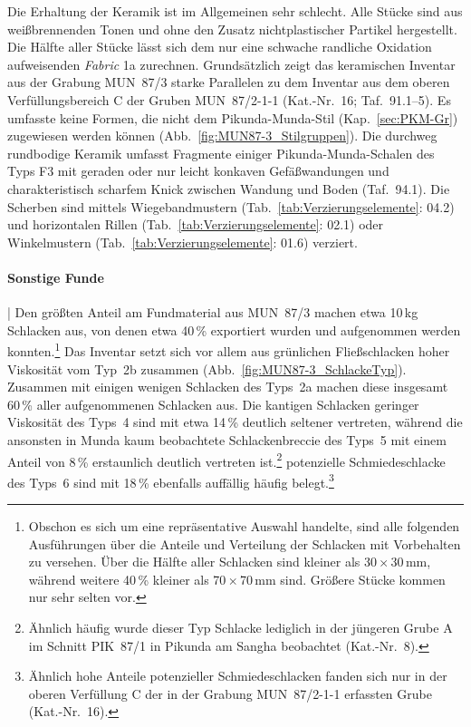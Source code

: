 Die Erhaltung der Keramik ist im Allgemeinen sehr schlecht. Alle Stücke sind aus weißbrennenden Tonen und ohne den Zusatz nichtplastischer Partikel hergestellt. Die Hälfte aller Stücke lässt sich dem nur eine schwache randliche Oxidation aufweisenden \textit{Fabric} 1a zurechnen. Grundsätzlich zeigt das keramischen Inventar aus der Grabung MUN~87/3 starke Parallelen zu dem Inventar aus dem oberen Verfüllungsbereich C der Gruben MUN~87/2-1-1 (Kat.-Nr.~16; Taf.~91.1--5). Es umfasste keine Formen, die nicht dem Pikunda-Munda-Stil (Kap.~\ref{sec:PKM-Gr}) zugewiesen werden können (Abb.~\ref{fig:MUN87-3_Stilgruppen}). Die durchweg rundbodige Keramik umfasst Fragmente einiger Pikunda-Munda-Schalen des Typs F3 mit geraden oder nur leicht konkaven Gefäßwandungen und charakteristisch scharfem Knick zwischen Wandung und Boden (Taf.~94.1). Die Scherben sind mittels Wiegebandmustern (Tab.~\ref{tab:Verzierungselemente}: 04.2) und horizontalen Rillen (Tab.~\ref{tab:Verzierungselemente}: 02.1) oder Winkelmustern (Tab.~\ref{tab:Verzierungselemente}: 01.6) verziert.

\paragraph{Sonstige Funde}\hspace{-.5em}|\hspace{.5em}%
Den größten Anteil am Fundmaterial aus MUN~87/3 machen etwa 10\,kg Schlacken aus, von denen etwa 40\,\% exportiert wurden und aufgenommen werden konnten.\footnote{Obschon es sich um eine repräsentative Auswahl handelte, sind alle folgenden Ausführungen über die Anteile und Verteilung der Schlacken mit Vorbehalten zu versehen. Über die Hälfte aller Schlacken sind kleiner als 30\,$\times$\,30\,mm, während weitere 40\,\% kleiner als 70\,$\times$\,70\,mm sind. Größere Stücke kommen nur sehr selten vor.} Das Inventar setzt sich vor allem aus grünlichen Fließschlacken hoher Viskosität vom Typ~2b zusammen (Abb.~\ref{fig:MUN87-3_SchlackeTyp}). Zusammen mit einigen wenigen Schlacken des Typs~2a machen diese insgesamt 60\,\% aller aufgenommenen Schlacken aus. Die kantigen Schlacken geringer Viskosität des Typs~4 sind mit etwa 14\,\% deutlich seltener vertreten, während die ansonsten in Munda kaum beobachtete Schlackenbreccie des Typs~5 mit einem Anteil von 8\,\% erstaunlich deutlich vertreten ist.\footnote{Ähnlich häufig wurde dieser Typ Schlacke lediglich in der jüngeren Grube A im Schnitt PIK~87/1 in Pikunda am \mbox{Sangha} beobachtet (Kat.-Nr.~8).} potenzielle Schmiedeschlacke des Typs~6 sind mit 18\,\% ebenfalls auffällig häufig belegt.\footnote{Ähnlich hohe Anteile potenzieller Schmiedeschlacken fanden sich nur in der oberen Verfüllung C der in der Grabung MUN~87/2-1-1 erfassten Grube (Kat.-Nr.~16).}


